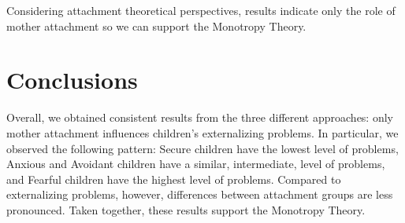 \documentclass[
]{book}
\begin{document}
Considering attachment theoretical perspectives, results indicate only the role of mother attachment so we can support the Monotropy Theory.

\hypertarget{conclusion-int}{%
\chapter{Conclusions}\label{conclusion-int}}

Overall, we obtained consistent results from the three different approaches: only mother attachment influences children's externalizing problems. In particular, we observed the following pattern: Secure children have the lowest level of problems, Anxious and Avoidant children have a similar, intermediate, level of problems, and Fearful children have the highest level of problems. Compared to externalizing problems, however, differences between attachment groups are less pronounced. Taken together, these results support the Monotropy Theory.

  
\end{document}

